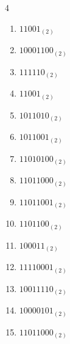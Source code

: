 \begin{multicols}{4}
\begin{enumerate}
        \phantom{$=9$}

  \item $11001_{(2)}$

        \phantom{$=25$}

\columnbreak %

  \item $10001100_{(2)}$

        \phantom{$=140$}

  \item $111110_{(2)}$

        \phantom{$=62$}

  \item $11001_{(2)}$

        \phantom{$=25$}

  \item $1011010_{(2)}$

        \phantom{$=90$}

  \item $1011001_{(2)}$

        \phantom{$=89$}

  \item $11010100_{(2)}$

        \phantom{$=212$}

  \item $11011000_{(2)}$

        \phantom{$=216$}

  \item $11011001_{(2)}$

        \phantom{$=217$}

  \item $1101100_{(2)}$

        \phantom{$=108$}

  \item $100011_{(2)}$

        \phantom{$=35$}

  \item $11110001_{(2)}$

        \phantom{$=241$}

  \item $10011110_{(2)}$

        \phantom{$=158$}

  \item $10000101_{(2)}$

        \phantom{$=133$}

  \item $11011000_{(2)}$


\end{enumerate}
\end{multicols}
